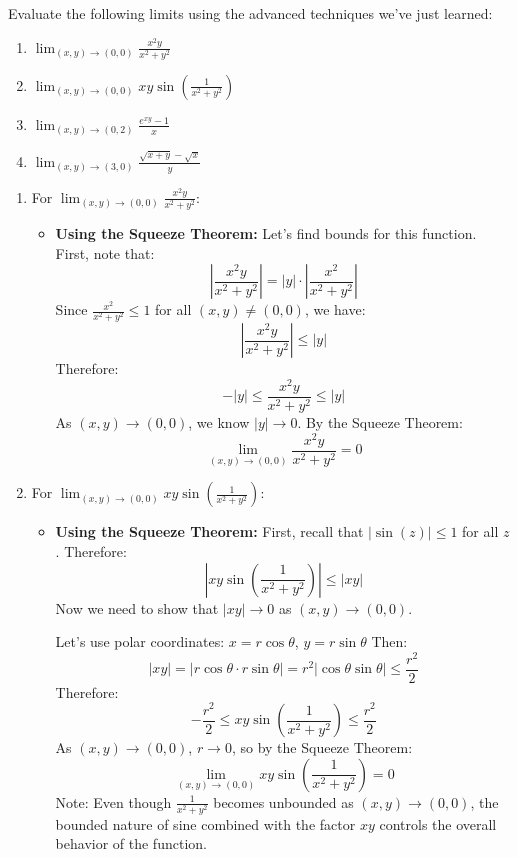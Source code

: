 \exampleline
\begin{example}
Evaluate the following limits using the advanced techniques we've just learned:
\begin{enumerate}
    \item \( \lim_{(x, y) \to (0, 0)} \frac{x^2y}{x^2 + y^2} \)
    \item \( \lim_{(x, y) \to (0, 0)} xy\sin\left(\frac{1}{x^2 + y^2}\right) \)
    \item \( \lim_{(x,y) \to (0,2)} \frac{e^{xy}-1}{x} \)
    \item \( \lim_{(x,y) \to (3,0)} \frac{\sqrt{x+y}-\sqrt{x}}{y} \)
\end{enumerate}

\begin{solution}
\begin{enumerate}
    \item For \( \lim_{(x, y) \to (0, 0)} \frac{x^2y}{x^2 + y^2} \):
    \begin{itemize}
        \item \textbf{Using the Squeeze Theorem:} Let's find bounds for this function.
        First, note that:
        \[
        \left|\frac{x^2y}{x^2 + y^2}\right| = |y| \cdot \left|\frac{x^2}{x^2 + y^2}\right|
        \]
        Since \( \frac{x^2}{x^2 + y^2} \leq 1 \) for all \( (x, y) \neq (0, 0) \), we have:
        \[
        \left|\frac{x^2y}{x^2 + y^2}\right| \leq |y|
        \]
        Therefore:
        \[
        -|y| \leq \frac{x^2y}{x^2 + y^2} \leq |y|
        \]
        As \( (x, y) \to (0, 0) \), we know \( |y| \to 0 \). By the Squeeze Theorem:
        \[
        \lim_{(x, y) \to (0, 0)} \frac{x^2y}{x^2 + y^2} = 0
        \]
    \end{itemize}

    \item For \( \lim_{(x, y) \to (0, 0)} xy\sin\left(\frac{1}{x^2 + y^2}\right) \):
    \begin{itemize}
        \item \textbf{Using the Squeeze Theorem:} First, recall that \( |\sin(z)| \leq 1 \) for all \( z \).
        Therefore:
        \[
        \left|xy\sin\left(\frac{1}{x^2 + y^2}\right)\right| \leq |xy|
        \]
        Now we need to show that \( |xy| \to 0 \) as \( (x, y) \to (0, 0) \).
        
        Let's use polar coordinates: \( x = r\cos\theta \), \( y = r\sin\theta \)
        Then:
        \[
        |xy| = |r\cos\theta \cdot r\sin\theta| = r^2|\cos\theta\sin\theta| \leq \frac{r^2}{2}
        \]
        Therefore:
        \[
        -\frac{r^2}{2} \leq xy\sin\left(\frac{1}{x^2 + y^2}\right) \leq \frac{r^2}{2}
        \]
        As \( (x, y) \to (0, 0) \), \( r \to 0 \), so by the Squeeze Theorem:
        \[
        \lim_{(x, y) \to (0, 0)} xy\sin\left(\frac{1}{x^2 + y^2}\right) = 0
        \]
        Note: Even though \( \frac{1}{x^2 + y^2} \) becomes unbounded as \( (x, y) \to (0, 0) \), the bounded nature of sine combined with the factor \( xy \) controls the overall behavior of the function.
    \end{itemize}


\end{enumerate}
\end{solution}
\end{example}
